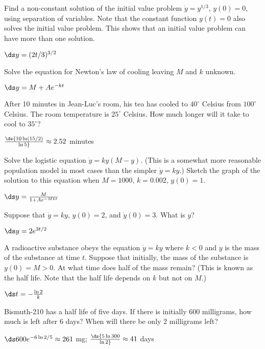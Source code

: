 \begin{exercises}
\exercise Find a non-constant solution of the initial value problem 
$\dot{y} = y^{1/3}$, $y(0)=0$, using
 separation of variables. Note that the constant function $y(t)=0 $
 also solves the initial value problem. This shows that an initial value
 problem can have more than one solution.
\begin{answer} $\ds y=(2t/3)^{3/2}$
\end{answer}

\exercise Solve the equation for Newton's law of cooling leaving $M$
and $k$ unknown.
\begin{answer} $\ds y=M+Ae^{-kt}$
\end{answer}

\exercise After 10 minutes in Jean-Luc's room, his tea has
cooled to $40^\circ $ Celsius from $100^\circ$ Celsius. 
The room temperature is $25^\circ$
Celsius. How much longer will it take to cool to $35^\circ$?
\begin{answer} $\ds {10\ln(15/2)\over\ln 5}\approx 2.52$ minutes
\end{answer} 

\exercise Solve \label{exer:logistic equation}
the {\dfont logistic equation\/} $\dot{y} = ky(M-y)$. (This is a somewhat more
reasonable population model in most cases than the simpler
$\dot y=ky$.) Sketch the
graph of the solution to this equation when 
$M=1000$, $k=0.002$, $y(0)=1$.
\begin{answer} $\ds y={M\over 1+Ae^{-Mkt}}$
\end{answer}

\exercise Suppose that $\dot{y} = ky$, $y(0)=2$, and $\dot{y}(0)=3$. 
What is $y$?
\begin{answer} $\ds y=2e^{3t/2}$
\end{answer}

\exercise A radioactive substance obeys the equation
$\dot{y} =ky$ where $k< 0 $ and $y$ is the mass of the
substance at time $t$. Suppose that initially, the mass of the
substance is $y(0)=M>0$. At what time does half of the mass remain?
(This is known as the half life. Note that the half life depends on
$k$ but not on $M$.)
\begin{answer} $\ds t=-{\ln 2\over k}$
\end{answer}

\exercise Bismuth-210 has a half life of five days. If there is
initially 600 milligrams, how much is left after 6 days? When will
there be only 2 milligrams left?
\begin{answer} $\ds 600e^{-6\ln 2/5}\approx 261$ mg; $\ds {5\ln
  300\over\ln2}\approx 41$ days
\end{answer}


\end{exercises}
